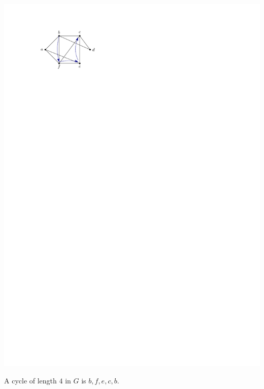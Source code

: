 \begin{Example}
\begin{center}
\includegraphics{Images/Path1.pdf}
\end{center}
A cycle of length $4$ in $G$ is $b, f, e, c, b$.


\end{Example}

